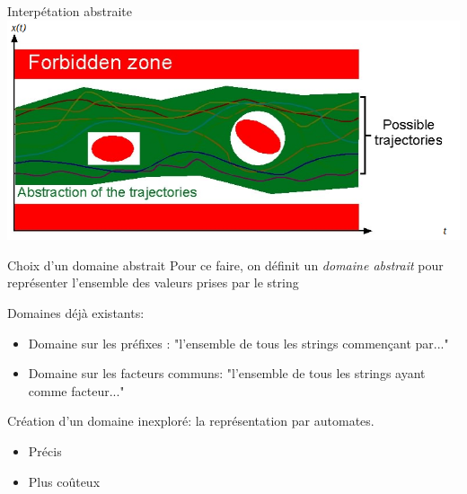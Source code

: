 \documentclass{beamer}
\begin{document}
\begin{frame}{Interpétation abstraite}
  \includegraphics[scale=0.6]{ absint_nutshell }
\end{frame}

\begin{frame}{Choix d'un domaine abstrait}
  Pour ce faire, on définit un \emph{domaine abstrait} pour
  représenter l'ensemble des valeurs prises par le string
  
  Domaines déjà existants:
  \begin{itemize}
    \item Domaine sur les préfixes : "l'ensemble de tous les strings commençant par..."
    \item Domaine sur les facteurs communs: "l'ensemble de tous les strings ayant comme facteur..."
  \end{itemize}
  
  Création d'un domaine inexploré: la représentation par automates.
  \begin{itemize}
    \item[\textcolor{green}{\textbullet}] Précis
    \item[\textcolor{red}{\textbullet}] Plus coûteux
  \end{itemize}
\end{frame}
\end{document}
